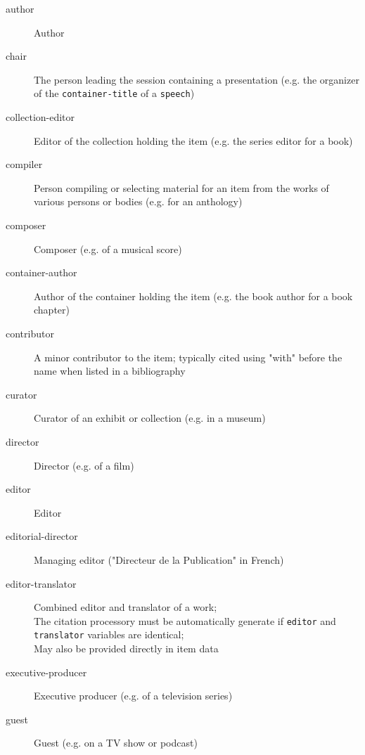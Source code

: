 \begin{description}

  \item[author]
    Author

  \item[chair]
    The person leading the session containing a presentation (e.g. the
    organizer of the \texttt{container-title} of a \texttt{speech})

  \item[collection-editor]
    Editor of the collection holding the item (e.g. the series editor for a
    book)

  \item[compiler]
    Person compiling or selecting material for an item from the works of
    various persons or bodies (e.g. for an anthology)

  \item[composer]
    Composer (e.g. of a musical score)

  \item[container-author]
    Author of the container holding the item (e.g. the book author for a
    book chapter)

  \item[contributor]
    A minor contributor to the item; typically cited using "with" before the
    name when listed in a bibliography

  \item[curator]
    Curator of an exhibit or collection (e.g. in a museum)

  \item[director]
    Director (e.g. of a film)

  \item[editor]
    Editor

  \item[editorial-director]
    Managing editor ("Directeur de la Publication" in French)

  \item[editor-translator]
    Combined editor and translator of a work;\\
    The citation processory must be automatically generate if
    \texttt{editor} and \texttt{translator} variables are identical;\\
    May also be provided directly in item data

  \item[executive-producer]
    Executive producer (e.g. of a television series)

  \item[guest]
    Guest (e.g. on a TV show or podcast)


\end{description}
